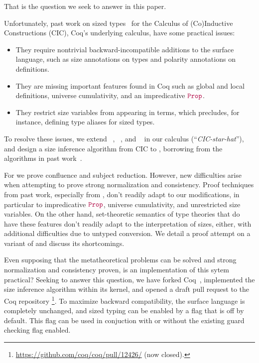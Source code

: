 \noindent That is the question we seek to answer in this paper.

Unfortunately, past work on sized types~\citep{cic-hat, cic-hat-minus,cc-hat-omega} for the Calculus of (Co)\-Inductive Constructions (CIC), Coq's underlying calculus, have some practical issues:

\begin{itemize}
    \item They require nontrivial backward-incompatible additions to the surface language,
      such as size annotations on \cofixpoint types and polarity annotations on \coinductive definitions.
    \item They are missing important features found in Coq such as global and local definitions,
      universe cumulativity, and an impredicative $\Prop$.
    \item They restrict size variables from appearing in terms, which precludes, for instance,
      defining type aliases for sized types.
\end{itemize}

To resolve these issues, we extend \CIChat~\citep{cic-hat}, \CIChatminus~\citep{cic-hat-minus-nat,cic-hat-minus}, and \CChatomega~\citep{cc-hat-omega} in our calculus \textbf{\lang} (``\emph{CIC-star-hat}''),
and design a size inference algorithm from CIC to \lang,
borrowing from the algorithms in past work~\citep{f-hat, cic-hat, cc-hat-omega}.

For \lang we prove confluence and subject reduction.
However, new difficulties arise when attempting to prove strong normalization and consistency.
Proof techniques from past work, especially from \citet{cic-hat-minus}, don't readily adapt to our modifications,
in particular to impredicative $\Prop$, universe cumulativity, and unrestricted size variables.
On the other hand, set-theoretic semantics of type theories that do have these features don't readily adapt to the interpretation of sizes, either,
with additional difficulties due to untyped conversion.
We detail a proof attempt on a variant of \lang and discuss its shortcomings.

Even supposing that the metatheoretical problems can be solved and strong normalization and consistency proven,
is an implementation of this sytem practical?
Seeking to answer this question, we have forked Coq~\citep{impl}, implemented the size inference algorithm within its kernel,
and opened a draft pull request to the Coq repository%
\footnote{\url{https://github.com/coq/coq/pull/12426/} (now closed).}.
To maximize backward compatibility, the surface language is completely unchanged,
and sized typing can be enabled by a flag that is off by default.
This flag can be used in conjuction with or without the existing guard checking flag enabled.

